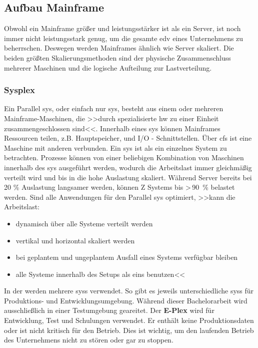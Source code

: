 \subsection{Aufbau Mainframe}

Obwohl ein Mainframe größer und leistungsstärker ist als ein Server, ist noch immer nicht leistungsstark genug, um die gesamte \ac{edv} eines Unternehmens zu beherrschen. Deswegen werden Mainframes ähnlich wie Server skaliert. Die beiden größten Skalierungsmethoden sind der physische Zusammenschluss mehrerer Maschinen und die logische Aufteilung zur Lastverteilung.


\subsubsection{Sysplex}
Ein Parallel \ac{sys}, oder einfach nur \ac{sys}, besteht aus einem oder mehreren Mainframe-Maschinen, die >>durch spezialisierte \ac{hw} zu einer Einheit zusammengeschlossen sind<<. Innerhalb eines \ac{sys} können Mainframes Ressourcen teilen, z.B. Hauptspeicher, und I/O - Schnittstellen. Über \acp{cf} ist eine Maschine mit anderen verbunden. Ein \ac{sys} ist als ein einzelnes System zu betrachten. Prozesse können von einer beliebigen Kombination von Maschinen innerhalb des \ac{sys} ausgeführt werden, wodurch die Arbeitslast immer gleichmäßig verteilt wird und bis in die hohe Auslastung skaliert. Während Server bereits bei 20 \% Auslastung langsamer werden, können Z Systems bis >\,90~\% belastet werden. Sind alle Anwendungen für den Parallel \ac{sys} optimiert, >>kann die Arbeitslast:
\begin{itemize}
    \item dynamisch über alle Systeme verteilt werden
    \item vertikal und horizontal skaliert werden
    \item bei geplantem und ungeplantem Ausfall eines Systems verfügbar bleiben
    \item alle Systeme innerhalb des Setups als eins benutzen<<\cite{redbook.1}
\end{itemize}

In der \FirmenName werden mehrere \acp{sys} verwendet. So gibt es jeweils unterschiedliche \acp{sys} für Produktions- und Entwicklungsumgebung. Während dieser Bachelorarbeit wird ausschließlich in einer Testumgebung geareitet. Der \textbf{E-Plex} wird für Entwicklung, Test und Schulungen verwendet. Er enthält keine Produktionsdaten oder ist nicht kritisch für den Betrieb. Dies ist wichtig, um den laufenden Betrieb des Unternehmens nicht zu stören oder gar zu stoppen. 


